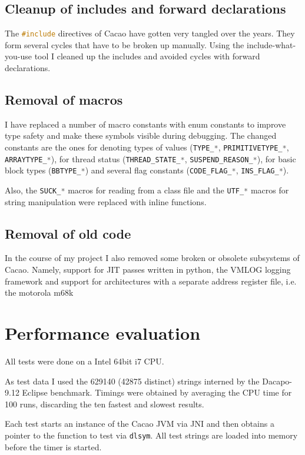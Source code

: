 \documentclass[12pt,a4paper,oneside]{article}
\newcommand{\cpp}[1]{\lstinline[language=C++]{#1}}
\begin{document}
\subsection{Cleanup of includes and forward declarations}
	The \cpp{#include} directives of Cacao have gotten very tangled over the years.
	They form several cycles that have to be broken up manually.
	Using the include-what-you-use\cite{iwyu} tool I cleaned up the includes and avoided cycles with forward declarations.

\subsection{Removal of macros}
	I have replaced a number of macro constants with enum constants to improve type safety and make these symbols visible during 
	debugging.
	The changed constants are the ones for denoting types of values (\cpp{TYPE_*}, \cpp{PRIMITIVETYPE_*}, \cpp{ARRAYTYPE_*}), for 
	thread status (\cpp{THREAD_STATE_*}, \cpp{SUSPEND_REASON_*}), for basic block types (\cpp{BBTYPE_*}) and several flag constants
	(\cpp{CODE_FLAG_*}, \cpp{INS_FLAG_*}).
	
	Also, the \cpp{SUCK_*} macros for reading from a class file and the \cpp{UTF_*} macros for string manipulation were replaced with inline functions.

\subsection{Removal of old code}
	In the course of my project I also removed some broken or obsolete subsystems of Cacao.
	Namely, support for JIT passes written in python, the VMLOG logging framework and 
	support for architectures with a separate address register file, i.e. the motorola m68k

\clearpage

\section{Performance evaluation}
	All tests were done on a Intel 64bit i7 CPU.

	As test data I used the 629140 (42875 distinct) strings interned by the Dacapo-9.12\cite{dacapo} Eclipse benchmark.
	Timings were obtained by averaging the CPU time for 100 runs, discarding the ten fastest and slowest results.	

	Each test starts an instance of the Cacao JVM via JNI and then obtains a pointer to the function to test via \cpp{dlsym}.
	All test strings are loaded into memory before the timer is started.
\end{document}

